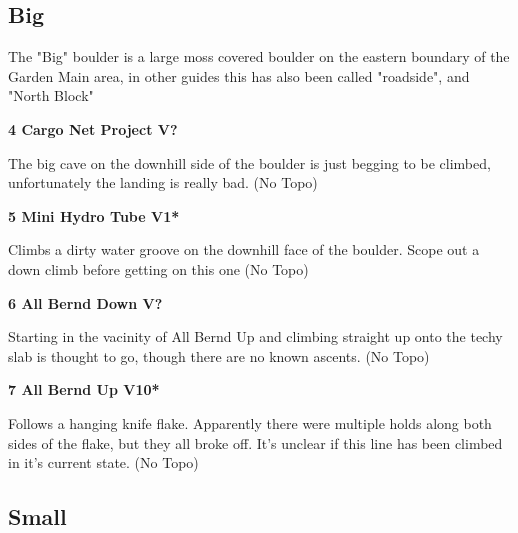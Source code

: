 \begin{multicols}{2}
		\subsection*{Big}\label{bf:Big}
		The "Big" boulder is a large moss covered boulder on the eastern boundary of the Garden Main area, in other guides this has also been called "roadside", and "North Block"\\
	
			\label{rt:Cargo Net Project}
\colorbox{black!20}{
\parbox{0.95\linewidth}{
\textbf{
4 Cargo Net Project V?  
}
}
}

			\begin{adjustwidth}{0.5cm}{}				
			The big cave on the downhill side of the boulder is just begging to be climbed, unfortunately the landing is really bad.
				\newline (No Topo) 
			\end{adjustwidth}
			\label{rt:Mini Hydro Tube}
\colorbox{green!20}{
\parbox{0.95\linewidth}{
\textbf{
5 Mini Hydro Tube V1*  \warn
}
}
}

			\begin{adjustwidth}{0.5cm}{}				
			Climbs a dirty water groove on the downhill face of the boulder. Scope out a down climb before getting on this one
				\newline (No Topo) 
			\end{adjustwidth}
			\label{rt:All Bernd Down}
\colorbox{black!20}{
\parbox{0.95\linewidth}{
\textbf{
6 All Bernd Down V?  
}
}
}

			\begin{adjustwidth}{0.5cm}{}				
			Starting in the vacinity of All Bernd Up and climbing straight up onto the techy slab is thought to go, though there are no known ascents.
				\newline (No Topo) 
			\end{adjustwidth}
			\label{rt:All Bernd Up}
\colorbox{red!20}{
\parbox{0.95\linewidth}{
\textbf{
7 All Bernd Up V10*  
}
}
}

			\begin{adjustwidth}{0.5cm}{}				
			Follows a hanging knife flake. Apparently there were multiple holds along both sides of the flake, but they all broke off. It's unclear if this line has been climbed in it's current state.
				\newline (No Topo) 
			\end{adjustwidth}
		\subsection*{Small}\label{bf:Small}
			

\end{multicols}

